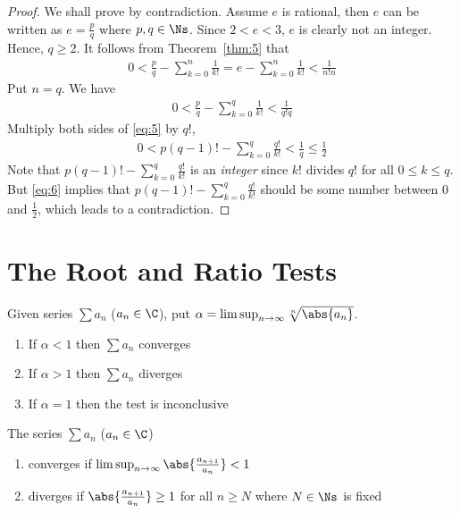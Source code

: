 \documentclass[thmcnt=section, 12pt]{elegantbook}
\begin{document}
\begin{proof}
    We shall prove by contradiction. Assume $e$ is rational, then $e$ can be written as $e = \frac{p}{q}$ where $p, q \in \Ns$. Since $2 < e < 3$, $e$ is clearly not an integer. Hence, $q \geq 2$. It follows from Theorem~\ref{thm:5} that
    \begin{align*}
        0 < \frac{p}{q} - \sum_{k=0}^{n} \frac{1}{k!} 
        = e - \sum_{k=0}^{n} \frac{1}{k!} 
        < \frac{1}{n! n}
    \end{align*}
    Put $n = q$. We have
    \begin{align}
        0 < \frac{p}{q} - \sum_{k=0}^{q} \frac{1}{k!}
        < \frac{1}{q! q}
        \label{eq:5}
    \end{align}
    Multiply both sides of \eqref{eq:5} by $q!$, 
    \begin{align}
        0 < p(q-1)! - \sum_{k=0}^{q} \frac{q!}{k!}
        < \frac{1}{q} \leq \frac{1}{2}
        \label{eq:6}
    \end{align}
    Note that $p(q-1)! - \sum_{k=0}^{q} \frac{q!}{k!}$ is an \textit{integer} since $k!$ divides $q!$ for all $0 \leq k \leq q$. But \eqref{eq:6} implies that $p(q-1)! - \sum_{k=0}^{q} \frac{q!}{k!}$ should be some number between $0$ and $\frac{1}{2}$, which leads to a contradiction.
\end{proof}


\section{The Root and Ratio Tests}


\begin{theorem} \label{thm:12}
    Given series $\sum a_n$ ($a_n \in \C$), put $\alpha = \limsup_{n \to \infty} \sqrt[n]{\abs{a_n}}$.
    \begin{enumerate}
        \item If $\alpha < 1$ then $\sum a_n$ converges
        \item If $\alpha > 1$ then $\sum a_n$ diverges 
        \item If $\alpha = 1$ then the test is inconclusive
    \end{enumerate}
\end{theorem}


\begin{theorem} \label{thm:24}
    The series $\sum a_n$ ($a_n \in \C$) 
    \begin{enumerate}
        \item converges if $\limsup_{n \to \infty} \abs{\frac{a_{n+1}}{a_n}} < 1$
        \item diverges if $\abs{\frac{a_{n+1}}{a_n}} \geq 1$ for all $n \geq N$ where $N \in \Ns$ is fixed
    \end{enumerate}
\end{theorem}
\end{document}
